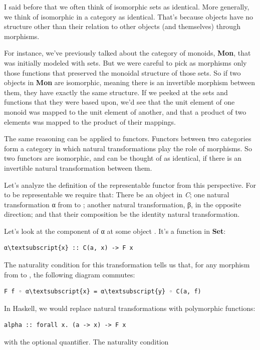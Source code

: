 I said before that we often think of isomorphic sets as identical. More
generally, we think of isomorphic  in a category as
identical. That's because objects have no structure other than their
relation to other objects (and themselves) through morphisms.

For instance, we've previously talked about the category of monoids,
\textbf{Mon}, that was initially modeled with sets. But we were careful
to pick as morphisms only those functions that preserved the monoidal
structure of those sets. So if two objects in \textbf{Mon} are
isomorphic, meaning there is an invertible morphism between them, they
have exactly the same structure. If we peeked at the sets and functions
that they were based upon, we'd see that the unit element of one monoid
was mapped to the unit element of another, and that a product of two
elements was mapped to the product of their mappings.

The same reasoning can be applied to functors. Functors between two
categories form a category in which natural transformations play the
role of morphisms. So two functors are isomorphic, and can be thought of
as identical, if there is an invertible natural transformation between
them.

Let's analyze the definition of the representable functor from this
perspective. For  to be representable we require that: There
be an object  in \emph{C}; one natural transformation α from
 to ; another natural transformation, β, in
the opposite direction; and that their composition be the identity
natural transformation.

Let's look at the component of α at some object . It's a
function in \textbf{Set}:

\begin{Verbatim}[commandchars=\\\{\}]
α\textsubscript{x} :: C(a, x) -> F x
\end{Verbatim}
The naturality condition for this transformation tells us that, for any
morphism  from  to , the following diagram
commutes:

\begin{Verbatim}[commandchars=\\\{\}]
F f ◦ α\textsubscript{x} = α\textsubscript{y} ◦ C(a, f)
\end{Verbatim}
In Haskell, we would replace natural transformations with polymorphic
functions:

\begin{Verbatim}[commandchars=\\\{\}]
alpha :: forall x. (a -> x) -> F x
\end{Verbatim}
with the optional  quantifier. The naturality condition

